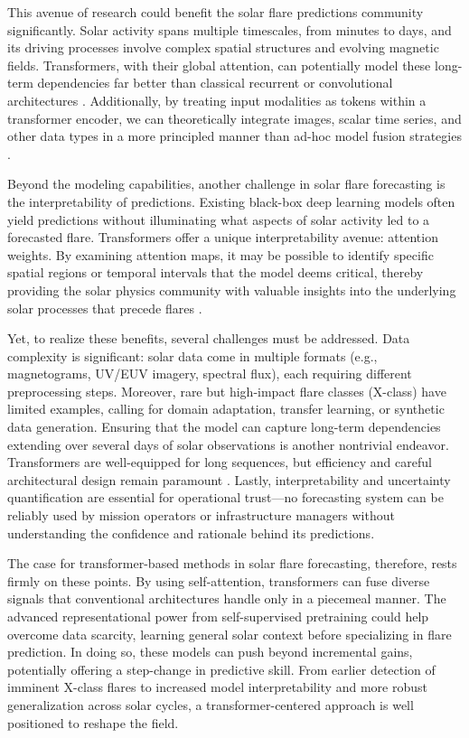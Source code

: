 This avenue of research could benefit the solar flare predictions community significantly. Solar activity spans multiple timescales, from minutes to days, and its driving processes involve complex spatial structures and evolving magnetic fields. Transformers, with their global attention, can potentially model these long-term dependencies far better than classical recurrent or convolutional architectures \citep{RefWorks:RefID:25-kaplanscaling}. Additionally, by treating input modalities as tokens within a transformer encoder, we can theoretically integrate images, scalar time series, and other data types in a more principled manner than ad-hoc model fusion strategies \citep{RefWorks:RefID:33-francisco2024multimodal}.

Beyond the modeling capabilities, another challenge in solar flare forecasting is the interpretability of predictions. Existing black-box deep learning models often yield predictions without illuminating what aspects of solar activity led to a forecasted flare. Transformers offer a unique interpretability avenue: attention weights. By examining attention maps, it may be possible to identify specific spatial regions or temporal intervals that the model deems critical, thereby providing the solar physics community with valuable insights into the underlying solar processes that precede flares \citep{RefWorks:RefID:34-gallagheri.}.

Yet, to realize these benefits, several challenges must be addressed. Data complexity is significant: solar data come in multiple formats (e.g., magnetograms, UV/EUV imagery, spectral flux), each requiring different preprocessing steps. Moreover, rare but high-impact flare classes (X-class) have limited examples, calling for domain adaptation, transfer learning, or synthetic data generation. Ensuring that the model can capture long-term dependencies extending over several days of solar observations is another nontrivial endeavor. Transformers are well-equipped for long sequences, but efficiency and careful architectural design remain paramount \citep{RefWorks:RefID:21-fedus2022switch}. Lastly, interpretability and uncertainty quantification are essential for operational trust—no forecasting system can be reliably used by mission operators or infrastructure managers without understanding the confidence and rationale behind its predictions.

The case for transformer-based methods in solar flare forecasting, therefore, rests firmly on these points. By using self-attention, transformers can fuse diverse signals that conventional architectures handle only in a piecemeal manner. The advanced representational power from self-supervised pretraining could help overcome data scarcity, learning general solar context before specializing in flare prediction. In doing so, these models can push beyond incremental gains, potentially offering a step-change in predictive skill. From earlier detection of imminent X-class flares to increased model interpretability and more robust generalization across solar cycles, a transformer-centered approach is well positioned to reshape the field.
